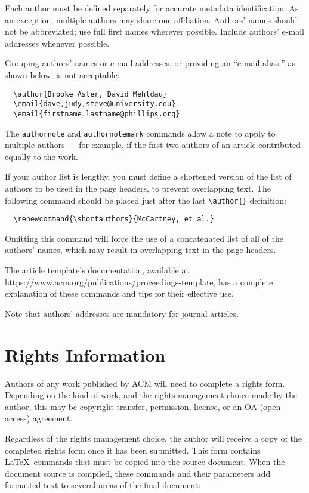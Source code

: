 \documentclass[11pt, sigconf]{acmart}
\begin{document}
Each author must be defined separately for accurate metadata
identification.  As an exception, multiple authors may share one
affiliation. Authors' names should not be abbreviated; use full first
names wherever possible. Include authors' e-mail addresses whenever
possible.

Grouping authors' names or e-mail addresses, or providing an ``e-mail
alias,'' as shown below, is not acceptable:
\begin{verbatim}
  \author{Brooke Aster, David Mehldau}
  \email{dave,judy,steve@university.edu}
  \email{firstname.lastname@phillips.org}
\end{verbatim}

The \verb|authornote| and \verb|authornotemark| commands allow a note
to apply to multiple authors --- for example, if the first two authors
of an article contributed equally to the work.

If your author list is lengthy, you must define a shortened version of
the list of authors to be used in the page headers, to prevent
overlapping text. The following command should be placed just after
the last \verb|\author{}| definition:
\begin{verbatim}
  \renewcommand{\shortauthors}{McCartney, et al.}
\end{verbatim}
Omitting this command will force the use of a concatenated list of all
of the authors' names, which may result in overlapping text in the
page headers.

The article template's documentation, available at
\url{https://www.acm.org/publications/proceedings-template}, has a
complete explanation of these commands and tips for their effective
use.

Note that authors' addresses are mandatory for journal articles.

\section{Rights Information}

Authors of any work published by ACM will need to complete a rights
form. Depending on the kind of work, and the rights management choice
made by the author, this may be copyright transfer, permission,
license, or an OA (open access) agreement.

Regardless of the rights management choice, the author will receive a
copy of the completed rights form once it has been submitted. This
form contains \LaTeX\ commands that must be copied into the source
document. When the document source is compiled, these commands and
their parameters add formatted text to several areas of the final
document:
\end{document}
